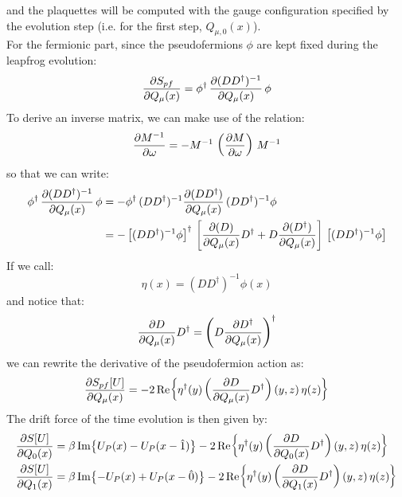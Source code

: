 and the plaquettes will be computed with the gauge configuration specified by the evolution step (i.e. for the first step, $Q_{\mu,0}(x)$).
\\ For the fermionic part, since the pseudofermions $\phi$ are kept fixed during the leapfrog evolution:
\begin{equation*}
    \pdv{S_{pf}}{Q_\mu(x)} = \phi^\dagger \, \pdv{(D D^\dagger)^{-1}}{Q_\mu(x)} \, \phi
\end{equation*}
To derive an inverse matrix, we can make use of the relation:
\begin{equation*}
    \pdv{M^{-1}}{\omega} = - M^{-1}\, \left(\pdv{M}{\omega} \right) \, M^{-1}
\end{equation*}
so that we can write:
\begin{equation*}
\begin{split}
       \phi^\dagger \, \pdv{(D D^\dagger)^{-1}}{Q_\mu(x)} \, \phi & = - \phi^\dagger \, (D D^\dagger)^{-1} \pdv{(D D^\dagger)}{Q_\mu(x)} \, (DD^\dagger)^{-1} \phi \\
        & = - \left[(DD^\dagger)^{-1} \phi \right]^\dagger \,  \left[ \pdv{(D)}{Q_\mu(x)}D^\dagger + D \pdv{(D^\dagger)}{Q_\mu(x)} \right]  \, \left[(DD^\dagger)^{-1} \phi \right]
\end{split}
\end{equation*}
If we call:
\begin{equation*}
    \eta(x) = (DD^\dagger)^{-1} \phi(x)
\end{equation*}
and notice that:
\begin{equation*}
    \pdv{D}{Q_\mu(x)}D^\dagger = \left(D \pdv{D^\dagger}{Q_\mu(x)} \right)^\dagger
\end{equation*}
we can rewrite the derivative of the pseudofermion action as:
\begin{equation}
    \pdv{S_{pf}[U]}{Q_\mu(x)} = - 2 \Re{\eta^\dagger(y) \left(\pdv{D}{Q_\mu(x)}D^\dagger\right) (y,z)\, \eta(z)  }
\end{equation}
The drift force of the time evolution is then given by:
\begin{equation}
\begin{split}
    \pdv{S[U]}{Q_0(x)} &= \beta \Im{U_P(x) - U_P(x - \hat{1})} - 2 \Re{\eta^\dagger(y) \left(\pdv{D}{Q_0(x)}D^\dagger\right) (y,z)\, \eta(z)}   \\
    \pdv{S[U]}{Q_1(x)} &= \beta \Im{- U_P(x) + U_P(x - \hat{0})} - 2 \Re{\eta^\dagger(y) \left(\pdv{D}{Q_1(x)}D^\dagger\right) (y,z)\, \eta(z)} 
\end{split}
\end{equation}
